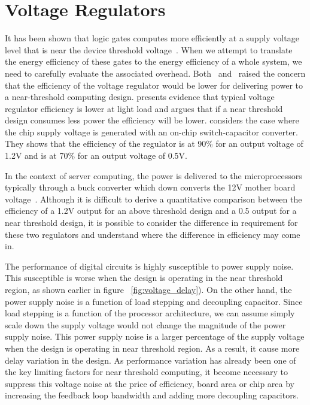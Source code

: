\section{Voltage Regulators}

It has been shown that logic gates computes more efficiently at a supply voltage level
that is near the device threshold voltage~\cite{Dreslinski:2010ez}. When we attempt to translate the
energy efficiency of these gates to the energy efficiency of a whole system, we
need to carefully evaluate the associated overhead.
Both~\cite{ISLPED:2011}
and~\cite{Pitfall:2010} raised the concern that the efficiency
of the voltage regulator would be lower for delivering power to a near-threshold
computing design. \cite{ISLPED:2011} presents evidence that
typical voltage regulator efficiency is lower at light load and argues that if a
near threshold design consumes less power the efficiency will be lower.
\cite{Pitfall:2010} considers the case where the chip supply
voltage is generated with an on-chip switch-capacitor converter. They shows that
the efficiency of the regulator is at 90\% for an output voltage of 1.2V and is
at 70\% for an output voltage of 0.5V.

In the context of server computing, the power is delivered to the
microprocessors typically through a buck converter which down converts the 12V
mother board voltage~\cite{Server:2006}. Although it is
difficult to derive a quantitative comparison between the efficiency of a 1.2V
output for an above threshold design and a 0.5 output for a near threshold
design, it is possible to consider the difference in requirement for these two
regulators and understand where the difference in efficiency may come in. 

The performance of digital circuits is highly susceptible to power supply noise.
This susceptible is worse when the design is operating in the near threshold
region, as shown earlier in figure ~\ref{fig:voltage_delay}). On the other hand,
the power supply noise is a function of load stepping and decoupling capacitor.
Since load stepping is a function of the processor architecture, we can assume
simply scale down the supply voltage would not change the magnitude of the power
supply noise. This power supply noise is a larger percentage of the supply
voltage when the design is operating in near threshold region. As a result, it
cause more delay variation in the design. As performance variation has already
been one of the key limiting factors for near threshold computing, it become
necessary to suppress this voltage noise at the price of efficiency, board area
or chip area by increasing the feedback loop bandwidth and adding more
decoupling capacitors.

